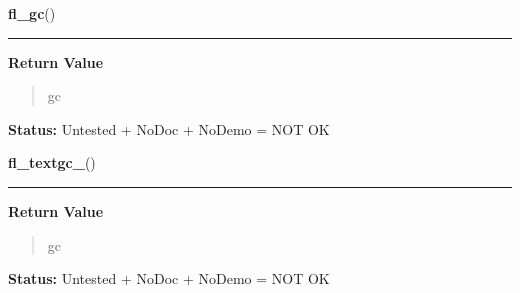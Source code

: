     \label{xformslib:library:fl_gc_}

    \vspace{0.5ex}

\hspace{.8\funcindent}\begin{boxedminipage}{\funcwidth}

    \raggedright \textbf{fl\_gc}()

    \vspace{-1.5ex}

    \rule{\textwidth}{0.5\fboxrule}
\setlength{\parskip}{2ex}
\setlength{\parskip}{1ex}
      \textbf{Return Value}
    \vspace{-1ex}

      \begin{quote}
      gc

      \end{quote}

\textbf{Status:} Untested + NoDoc + NoDemo = NOT OK



    \end{boxedminipage}

    \label{xformslib:library:fl_textgc_}

    \vspace{0.5ex}

\hspace{.8\funcindent}\begin{boxedminipage}{\funcwidth}

    \raggedright \textbf{fl\_textgc\_}()

    \vspace{-1.5ex}

    \rule{\textwidth}{0.5\fboxrule}
\setlength{\parskip}{2ex}
\setlength{\parskip}{1ex}
      \textbf{Return Value}
    \vspace{-1ex}

      \begin{quote}
      gc

      \end{quote}

\textbf{Status:} Untested + NoDoc + NoDemo = NOT OK



    \end{boxedminipage}

